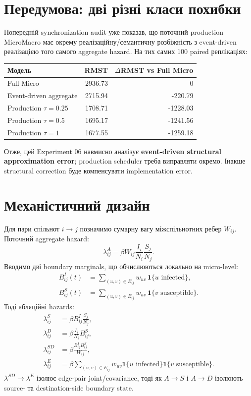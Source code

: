 \documentclass[11pt,a4paper]{article}
\begin{document}
\section{Передумова: дві різні класи похибки}
Попередній synchronization audit уже показав, що поточний production MicroMacro має окрему реалізаційну/семантичну розбіжність з event-driven реалізацією того самого aggregate hazard. На тих самих 100 paired реплікаціях:
\begin{center}
\begin{tabular}{lrr}
\toprule
Модель & RMST & $\Delta$RMST vs Full Micro\\
\midrule
Full Micro & 2936.73 & 0\\
Event-driven aggregate & 2715.94 & -220.79\\
Production $\tau=0.25$ & 1708.71 & -1228.03\\
Production $\tau=0.5$ & 1695.17 & -1241.56\\
Production $\tau=1$ & 1677.55 & -1259.18\\
\bottomrule
\end{tabular}
\end{center}
Отже, цей Experiment 06 навмисно аналізує \textbf{event-driven structural approximation error}; production scheduler треба виправляти окремо. Інакше structural correction буде компенсувати implementation error.

\section{Механістичний дизайн}
Для пари спільнот $i\to j$ позначимо сумарну вагу міжспільнотних ребер $W_{ij}$. Поточний aggregate hazard:
\begin{equation}
\lambda^{A}_{ij}=\beta W_{ij}\frac{I_i}{N_i}\frac{S_j}{N_j}.
\end{equation}
Вводимо дві boundary marginals, що обчислюються локально на micro-level:
\begin{align}
B^{I}_{ij}(t)&=\sum_{(u,v)\in E_{ij}} w_{uv}\,\mathbf 1\{u\text{ infected}\},\\
B^{S}_{ij}(t)&=\sum_{(u,v)\in E_{ij}} w_{uv}\,\mathbf 1\{v\text{ susceptible}\}.
\end{align}
Тоді абляційні hazards:
\begin{align}
\lambda^{S}_{ij}&=\beta B^{I}_{ij}\frac{S_j}{N_j},\\
\lambda^{D}_{ij}&=\beta \frac{I_i}{N_i}B^{S}_{ij},\\
\lambda^{SD}_{ij}&=\beta\frac{B^{I}_{ij}B^{S}_{ij}}{W_{ij}},\\
\lambda^{E}_{ij}&=\beta\sum_{(u,v)\in E_{ij}}w_{uv}\mathbf 1\{u\text{ infected}\}\mathbf 1\{v\text{ susceptible}\}.
\end{align}
$\lambda^{SD}\to\lambda^{E}$ ізолює edge-pair joint/covariance, тоді як $A\to S$ і $A\to D$ ізолюють source- та destination-side boundary state.
\end{document}
